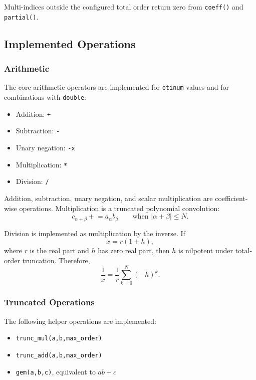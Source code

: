 \documentclass[11pt]{article}
\begin{document}
Multi-indices outside the configured total order return zero from
\texttt{coeff()} and \texttt{partial()}.

\subsection{Implemented Operations}

\subsubsection{Arithmetic}

The core arithmetic operators are implemented for \texttt{otinum} values and
for combinations with \texttt{double}:

\begin{itemize}[noitemsep]
    \item Addition: \texttt{+}
    \item Subtraction: \texttt{-}
    \item Unary negation: \texttt{-x}
    \item Multiplication: \texttt{*}
    \item Division: \texttt{/}
\end{itemize}

Addition, subtraction, unary negation, and scalar multiplication are
coefficient-wise operations. Multiplication is a truncated polynomial
convolution:
\[
    c_{\alpha+\beta} \mathrel{+}= a_\alpha b_\beta
    \qquad \text{when } |\alpha+\beta| \leq N.
\]

Division is implemented as multiplication by the inverse. If
\[
    x = r(1+h),
\]
where \(r\) is the real part and \(h\) has zero real part, then \(h\) is
nilpotent under total-order truncation. Therefore,
\[
    \frac{1}{x}
    =
    \frac{1}{r}
    \sum_{k=0}^{N} (-h)^k.
\]

\subsubsection{Truncated Operations}

The following helper operations are implemented:

\begin{itemize}[noitemsep]
    \item \texttt{trunc\_mul(a,b,max\_order)}
    \item \texttt{trunc\_add(a,b,max\_order)}
    \item \texttt{gem(a,b,c)}, equivalent to \(a b + c\)
\end{itemize}
\end{document}
